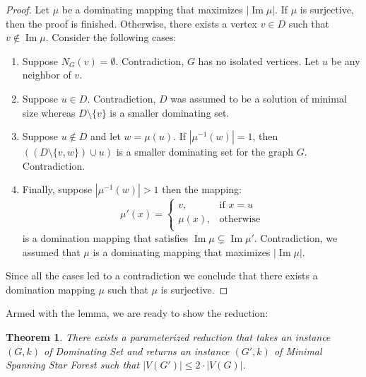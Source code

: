 \documentclass[en]{pracamgr}
\newtheorem{theorem}{Theorem}
\newcommand{\mssfp}{{\sc Minimal Spanning Star Forest}}
\newcommand{\domsetp}{{\sc Dominating Set}}
\DeclareMathOperator{\Ima}{Im}
\begin{document}
\begin{proof}
	Let $\mu$ be a dominating mapping that maximizes $|\Ima \mu|$. If $\mu$ is surjective, then the proof is finished. Otherwise, there exists a vertex $v \in D$ such that $v \notin \Ima \mu$. Consider the following cases:
	\begin{enumerate}
		\item Suppose $N_G(v) = \emptyset$. Contradiction, $G$ has no isolated vertices. Let $u$ be any neighbor of $v$.
		\item Suppose $u \in D$. Contradiction, $D$ was assumed to be a solution of minimal size whereas $D \setminus \{v\}$ is a smaller dominating set.
		\item Suppose $u \notin D$ and let $w = \mu(u)$. If $|\mu^{-1}(w)|=1$, then $((D \setminus \{v,w\}) \cup u)$ is a smaller dominating set for the graph $G$. Contradiction.
		\item Finally, suppose $|\mu^{-1}(w)| > 1$ then the mapping:
		\begin{equation*}
			\mu'(x) = \begin{cases}
			v, & \text{if }x = u \\
			\mu(x), &\text{otherwise} \\
			\end{cases}
		\end{equation*}
		is a domination mapping that satisfies $\Ima \mu \subsetneq \Ima \mu'$. Contradiction, we assumed that $\mu$ is a dominating mapping that maximizes $|\Ima \mu|$.
	\end{enumerate}
	
	Since all the cases led to a contradiction we conclude that there exists a domination mapping $\mu$ such that $\mu$ is surjective.  
\end{proof}

Armed with the lemma, we are ready to show the reduction:

\begin{theorem}\label{dom-ssf reduction}
	There exists a parameterized reduction that takes an instance $(G,k)$ of \domsetp{} and returns an instance $(G',k)$ of \mssfp{} such that $|V(G')| \leq 2 \cdot |V(G)|$. 
\end{theorem}
\end{document}
